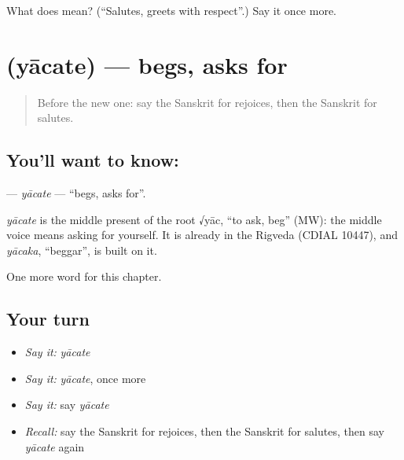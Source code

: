 \begin{tcolorbox}[breakable,colback=teal!4,colframe=teal!35!black,title={Before you move on}]
What does  mean? (\textquotedblleft{}Salutes, greets with respect\textquotedblright{}.) Say it once more.
\end{tcolorbox}
\section[\texorpdfstring{\sk{याचते} (yācate)}{याचते (yācate)}]{ (yācate) — begs, asks for}

\label{lesson:SA-C203-yacate}



\begin{quote}
Before the new one: say the Sanskrit for rejoices, then the Sanskrit for salutes.
\end{quote}

\subsection*{You'll want to know: }
\textbf{} — \emph{yācate} — \textquotedblleft{}begs, asks for\textquotedblright{}.

\begin{cousinweb}
\emph{yācate} is the middle present of the root √yāc, \textquotedblleft{}to ask, beg\textquotedblright{} (MW): the middle voice means asking for yourself. It is already in the Rigveda (CDIAL 10447), and \emph{yācaka}, \textquotedblleft{}beggar\textquotedblright{}, is built on it.
\end{cousinweb}

\begin{grammarlens}[title={What you've built}]
One more word for this chapter.
\end{grammarlens}

\subsection*{Your turn}
\begin{itemize}
\raggedright
  \item \emph{Say it:} \emph{yācate}
  \item \emph{Say it:} \emph{yācate}, once more
  \item \emph{Say it:} say \emph{yācate}
  \item \emph{Recall:} say the Sanskrit for rejoices, then the Sanskrit for salutes, then say \emph{yācate} again
\end{itemize}

